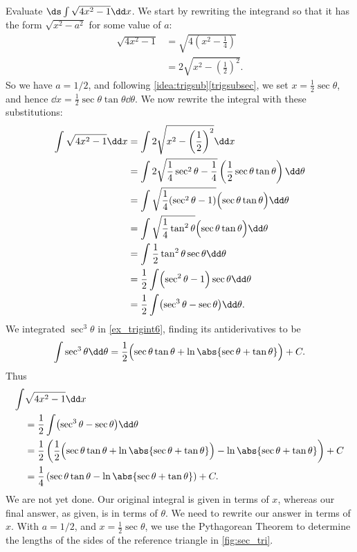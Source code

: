 \begin{example}\label{ex_trigsub2}
Evaluate $\ds \int \sqrt{4x^2-1}\dd x$.
\solution
We start by rewriting the integrand so that it has the form $\sqrt{x^2-a^2}$ for some value of $a$:
\begin{align*}
\sqrt{4x^2-1} &= \sqrt{4\left(x^2-\frac14\right)}\\
		&= 2\sqrt{x^2-\left(\frac12\right)^2}.
\end{align*}
So we have $a=1/2$, and following \autoref{idea:trigsub}\ref*{trigsubsec}, we set $x= \frac12\sec\theta$, and hence $\dd x = \frac12\sec\theta\tan\theta\dd\theta$. %
We now rewrite the integral with these substitutions:\vspace{-.3\baselineskip}
\begin{align*}
	\int \sqrt{4x^2-1}\dd x &= \int 2\sqrt{x^2-\left(\frac12\right)^2}\dd x\\
	&= \int 2\sqrt{\frac14\sec^2\theta - \frac14}
	\left(\frac12\sec\theta\tan\theta\right)\dd\theta\\
	&=\int \sqrt{\frac14(\sec^2\theta-1)}\Bigl(\sec\theta\tan\theta\Bigr)\dd\theta\\
	&=\int\sqrt{\frac14\tan^2\theta}\Bigl(\sec\theta\tan\theta\Bigr)\dd\theta\\
	&=\int \frac12\tan^2\theta\sec\theta\dd\theta\\
	&=\frac12\int \Bigl(\sec^2\theta-1\Bigr)\sec\theta\dd\theta\\
	&=\frac12\int \bigl(\sec^3\theta - \sec\theta\bigr)\dd\theta.
\end{align*}
We integrated $\sec^3\theta$ in \autoref{ex_trigint6}, finding its antiderivatives to be
\[
\int\sec^3\theta\dd\theta
=\frac12\Bigl(\sec\theta\tan\theta+\ln\abs{\sec\theta+\tan\theta}\Bigr)+C.
\]
Thus
\begin{align*}
\int &\sqrt{4x^2-1}\dd x\\
	&=\frac12\int \bigl(\sec^3\theta-\sec\theta\bigr)\dd\theta\\
	&= \frac12\left(\frac12\Bigl(\sec\theta\tan\theta
	+\ln\abs{\sec\theta+\tan \theta}\Bigr)-\ln\abs{\sec\theta+\tan\theta}\right) + C\\
	&= \frac14\left(\sec\theta\tan\theta -\ln\abs{\sec\theta+\tan\theta}\right)+C.
\end{align*}
We are not yet done. Our original integral is given in terms of $x$, whereas our final answer, as given, is in terms of $\theta$. We need to rewrite our answer in terms of $x$. With $a=1/2$, and $x=\frac12\sec\theta$, we use the Pythagorean Theorem to determine the lengths of the sides of the reference triangle in \autoref{fig:sec_tri}.

\end{example}
